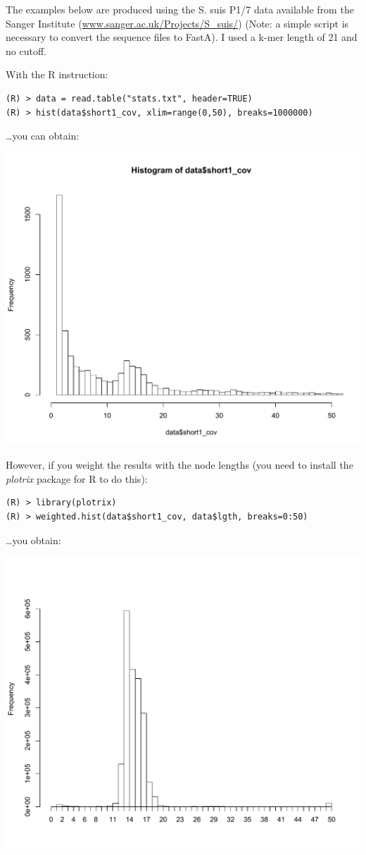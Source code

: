 \documentclass{article}
\begin{document}
The examples below are produced using the S. suis P1/7 data available from the Sanger Institute (\href{http://www.sanger.ac.uk/Projects/S_suis/}{www.sanger.ac.uk/Projects/S\_suis/}) (Note: a simple script is necessary to convert the sequence files to FastA).  I used a k-mer length of 21 and no cutoff. 

With the R instruction:
\begin{verbatim}
(R) > data = read.table("stats.txt", header=TRUE)
(R) > hist(data$short1_cov, xlim=range(0,50), breaks=1000000)
\end{verbatim}
\ldots you can obtain:

\includegraphics[keepaspectratio=true,width=300bp]{./Suis_plot_1.pdf}

However, if you weight the results with the node lengths (you need to install the \emph{plotrix} package for R to do this):
\begin{verbatim}
(R) > library(plotrix)
(R) > weighted.hist(data$short1_cov, data$lgth, breaks=0:50)
\end{verbatim}
\ldots you obtain:

\includegraphics[keepaspectratio=true,width=300bp]{./suis_plot.pdf}
\end{document}
